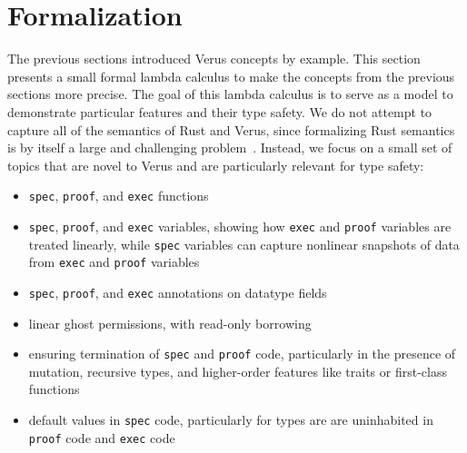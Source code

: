 
\section{Formalization} \label{sec:formalization}

The previous sections introduced Verus concepts by example.
This section presents a small formal lambda calculus to make the concepts
from the previous sections more precise.
The goal of this lambda calculus is to serve as a model
to demonstrate particular features and their type safety.
We do not attempt to capture all of the semantics of Rust and Verus,
since formalizing Rust semantics is by itself a large and
challenging problem~\cite{pearce-rust-toplas2021, DBLP:journals/corr/abs-1903-00982, DBLP:journals/pacmpl/0002JKD18}.
Instead, we focus on a small set of topics that are novel to Verus
and are particularly relevant for type safety:

\begin{itemize}
\item \verb`spec`, \verb`proof`, and \verb`exec` functions
\item \verb`spec`, \verb`proof`, and \verb`exec` variables,
  showing how \verb`exec` and \verb`proof` variables are treated linearly,
  while \verb`spec` variables can capture nonlinear snapshots of data
  from \verb`exec` and \verb`proof` variables
\item \verb`spec`, \verb`proof`, and \verb`exec` annotations on datatype fields
\item linear ghost permissions, with read-only borrowing
\item ensuring termination of \verb`spec` and \verb`proof` code,
  particularly in the presence of mutation, recursive types,
  and higher-order features like traits or first-class functions
\ifextended
\item default values in \verb`spec` code,
  particularly for types are are uninhabited in \verb`proof` code and \verb`exec` code
\fi
\end{itemize}

